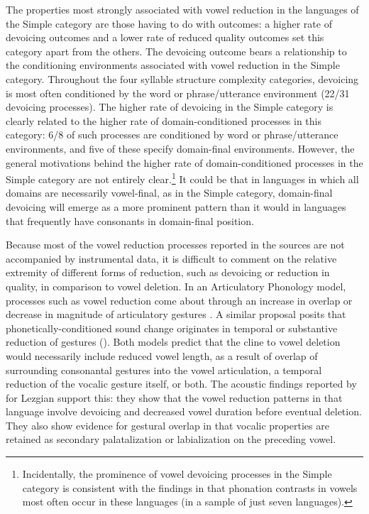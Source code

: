   The properties most strongly associated with vowel reduction in the languages of the Simple category are those having to do with outcomes: a higher rate of devoicing outcomes and a lower rate of reduced quality outcomes set this category apart from the others. The devoicing outcome bears a relationship to the conditioning environments associated with vowel reduction in the Simple category. Throughout the four syllable structure complexity categories, devoicing is most often conditioned by the word or phrase/utterance environment (22/31 devoicing processes). The higher rate of devoicing in the Simple category is clearly related to the higher rate of domain-conditioned processes in this category: 6/8 of such processes are conditioned by word or phrase/utterance environments, and five of these specify domain-final environments. However, the general motivations behind the higher rate of domain-conditioned processes in the Simple category are not entirely clear.\footnote{{Incidentally, the prominence of vowel devoicing processes in the Simple category is consistent with the findings in  that phonation contrasts in vowels most often occur in these languages (in a sample of just seven languages).}} It could be that in languages in which all domains are necessarily vowel-final, as in the Simple category, domain-final devoicing will emerge as a more prominent pattern than it would in languages that frequently have consonants in domain-final position.

  Because most of the vowel reduction processes reported in the sources are not accompanied by instrumental data, it is difficult to comment on the relative extremity of different forms of reduction, such as devoicing or reduction in quality, in comparison to vowel deletion. In an Articulatory Phonology model, processes such as vowel reduction come about through an increase in overlap or decrease in magnitude of articulatory gestures \citep{BrowmanGoldstein1992b}. A similar proposal posits that phonetically-conditioned sound change originates in temporal or substantive reduction of gestures (\citealt{MowreyPagliuca1995}). Both models predict that the cline to vowel deletion would necessarily include reduced vowel length, as a result of overlap of surrounding consonantal gestures into the vowel articulation, a temporal reduction of the vocalic gesture itself, or both. The acoustic findings reported by \citet{ChitoranBabaliyeva2007} for Lezgian support this: they show that the vowel reduction patterns in that language involve devoicing and decreased vowel duration before eventual deletion. They also show evidence for gestural overlap in that vocalic properties are retained as secondary palatalization or labialization on the preceding vowel.


